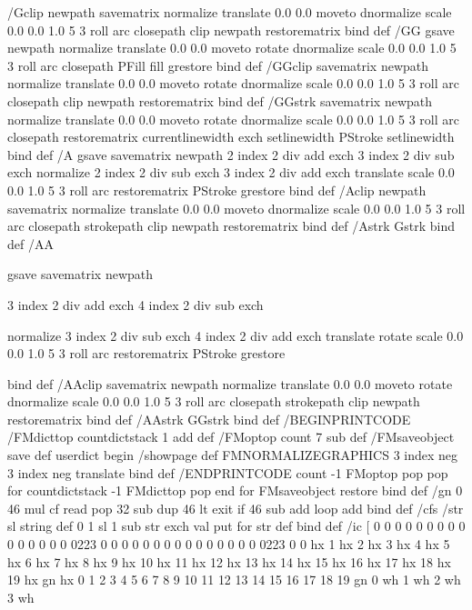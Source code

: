 /Gclip { 
	newpath
	savematrix
	normalize translate 0.0 0.0 moveto 
	dnormalize scale 
	0.0 0.0 1.0 5 3 roll arc 
	closepath 
	clip newpath
	restorematrix
	} bind def
/GG { 
	gsave
	newpath
	normalize translate 0.0 0.0 moveto 
	rotate 
	dnormalize scale 
	0.0 0.0 1.0 5 3 roll arc 
	closepath
	PFill
	fill
	grestore
	} bind def
/GGclip { 
	savematrix
	newpath
    normalize translate 0.0 0.0 moveto 
    rotate 
    dnormalize scale 
    0.0 0.0 1.0 5 3 roll arc 
    closepath
	clip newpath
	restorematrix
	} bind def
/GGstrk { 
	savematrix
    newpath
    normalize translate 0.0 0.0 moveto 
    rotate 
    dnormalize scale 
    0.0 0.0 1.0 5 3 roll arc 
    closepath 
	restorematrix
    currentlinewidth exch setlinewidth PStroke setlinewidth
	} bind def
/A { 
	gsave
	savematrix
	newpath
	2 index 2 div add exch 3 index 2 div sub exch 
	normalize 2 index 2 div sub exch 3 index 2 div add exch 
	translate 
	scale 
	0.0 0.0 1.0 5 3 roll arc 
	restorematrix
	PStroke
	grestore
	} bind def
/Aclip {
	newpath
	savematrix
	normalize translate 0.0 0.0 moveto 
	dnormalize scale 
	0.0 0.0 1.0 5 3 roll arc 
	closepath 
	strokepath clip newpath
	restorematrix
} bind def
/Astrk {
	Gstrk
} bind def
/AA { 
	gsave
	savematrix
	newpath
	
	3 index 2 div add exch 4 index 2 div sub exch 
	
	normalize 3 index 2 div sub exch 4 index 2 div add exch
	translate 
	rotate 
	scale 
	0.0 0.0 1.0 5 3 roll arc 
	restorematrix
	PStroke
	grestore
	} bind def
/AAclip {
	savematrix
	newpath
    normalize translate 0.0 0.0 moveto 
    rotate 
    dnormalize scale 
    0.0 0.0 1.0 5 3 roll arc 
    closepath
	strokepath clip newpath
	restorematrix
} bind def
/AAstrk {
	GGstrk
} bind def
/BEGINPRINTCODE { 
	/FMdicttop countdictstack 1 add def 
	/FMoptop count 7 sub def 
	/FMsaveobject save def
	userdict begin 
	/showpage {} def 
	FMNORMALIZEGRAPHICS 
	3 index neg 3 index neg translate
	} bind def
/ENDPRINTCODE {
	count -1 FMoptop {pop pop} for 
	countdictstack -1 FMdicttop {pop end} for 
	FMsaveobject restore 
	} bind def
/gn { 
	0 
	{	46 mul 
		cf read pop 
		32 sub 
		dup 46 lt {exit} if 
		46 sub add 
		} loop
	add 
	} bind def
/cfs { 
	/str sl string def 
	0 1 sl 1 sub {str exch val put} for 
	str def 
	} bind def
/ic [ 
	0 0 0 0 0 0 0 0 0 0 0 0 0 0 0 0223
	0 0 0 0 0 0 0 0 0 0 0 0 0 0 0 0223
	0
	{0 hx} {1 hx} {2 hx} {3 hx} {4 hx} {5 hx} {6 hx} {7 hx} {8 hx} {9 hx}
	{10 hx} {11 hx} {12 hx} {13 hx} {14 hx} {15 hx} {16 hx} {17 hx} {18 hx}
	{19 hx} {gn hx} {0} {1} {2} {3} {4} {5} {6} {7} {8} {9} {10} {11} {12}
	{13} {14} {15} {16} {17} {18} {19} {gn} {0 wh} {1 wh} {2 wh} {3 wh}

